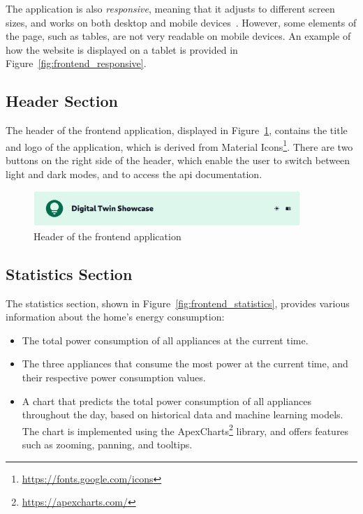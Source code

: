 The application is also \textit{responsive}, meaning that it adjusts to different screen sizes, and works on both desktop and mobile devices~\parencite{marcotteResponsiveWebDesign2010}. However, some elements of the page, such as tables, are not very readable on mobile devices. An example of how the website is displayed on a tablet is provided in Figure~\ref{fig:frontend_responsive}. 

\subsection{Header Section}

The header of the frontend application, displayed in Figure~\ref{fig:frontend_header}, contains the title and logo of the application, which is derived from Material Icons\footnote{\url{https://fonts.google.com/icons}}. There are two buttons on the right side of the header, which enable the user to switch between light and dark modes, and to access the \acrshort{api} documentation.

\begin{figure}
    \centering
    \includegraphics[width=0.9\textwidth]{images/frontend/header.png}
    \caption{Header of the frontend application}
    \label{fig:frontend_header}
\end{figure}

\subsection{Statistics Section}

The statistics section, shown in Figure~\ref{fig:frontend_statistics}, provides various information about the home's energy consumption:
\begin{itemize}
    \item The total power consumption of all appliances at the current time.
    \item The three appliances that consume the most power at the current time, and their respective power consumption values.
    \item A chart that predicts the total power consumption of all appliances throughout the day, based on historical data and machine learning models. The chart is implemented using the ApexCharts\footnote{\url{https://apexcharts.com/}} library, and offers features such as zooming, panning, and tooltips.
\end{itemize}

